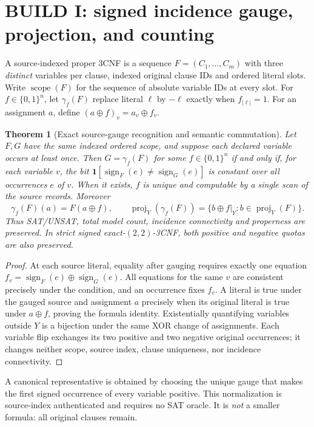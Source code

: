 \documentclass[11pt]{article}
\newtheorem{theorem}{Theorem}
\newcommand{\proj}{\operatorname{proj}}
\begin{document}
\section{BUILD I: signed incidence gauge, projection, and counting}
A source-indexed proper 3CNF is a sequence $F=(C_1,\ldots,C_m)$ with three \emph{distinct} variables per clause, indexed original clause IDs and ordered literal slots. Write $\operatorname{scope}(F)$ for the sequence of absolute variable IDs at every slot. For $f\in\{0,1\}^n$, let $\gamma_f(F)$ replace literal $\ell$ by $-\ell$ exactly when $f_{|\ell|}=1$. For an assignment $a$, define $(a\oplus f)_v=a_v\oplus f_v$.

\begin{theorem}[Exact source-gauge recognition and semantic commutation]\label{t:gauge}
Let $F,G$ have the same indexed ordered scope, and suppose each declared variable occurs at least once. Then $G=\gamma_f(F)$ for some $f\in\{0,1\}^n$ if and only if, for each variable $v$, the bit $\mathbf 1[\operatorname{sign}_F(e)\ne\operatorname{sign}_G(e)]$ is constant over all occurrences $e$ of $v$. When it exists, $f$ is unique and computable by a single scan of the source records. Moreover
\[
\gamma_f(F)(a)=F(a\oplus f),\qquad
\proj_Y(\gamma_f(F))=\{b\oplus f|_Y:b\in\proj_Y(F)\}.
\]
Thus SAT/UNSAT, total model count, incidence connectivity and properness are preserved. In strict signed exact-$(2,2)$-3CNF, both positive and negative quotas are also preserved.
\end{theorem}
\begin{proof}
At each source literal, equality after gauging requires exactly one equation $f_v=\operatorname{sign}_F(e)\oplus\operatorname{sign}_G(e)$. All equations for the same $v$ are consistent precisely under the condition, and an occurrence fixes $f_v$. A literal is true under the gauged source and assignment $a$ precisely when its original literal is true under $a\oplus f$, proving the formula identity. Existentially quantifying variables outside $Y$ is a bijection under the same XOR change of assignments. Each variable flip exchanges its two positive and two negative original occurrences; it changes neither scope, source index, clause uniqueness, nor incidence connectivity.
\end{proof}

A canonical representative is obtained by choosing the unique gauge that makes the first signed occurrence of every variable positive. This normalization is source-index authenticated and requires no SAT oracle. It is \emph{not} a smaller formula: all original clauses remain.
\end{document}
